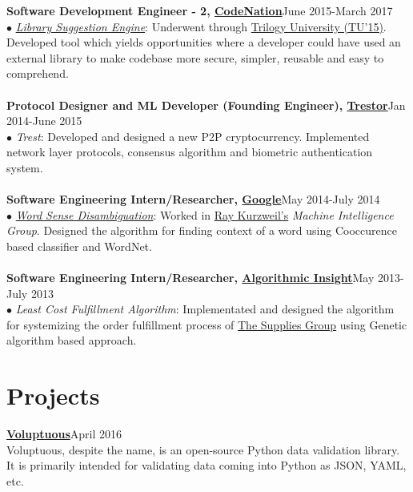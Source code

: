 \documentclass[margin,line]{resume}
\begin{document}
\begin{resume}
{\bf Software Development Engineer - 2, \href{http://codenation.co.in/}{CodeNation}}\hfill June 2015-March 2017\\
	$\bullet$ \href{https://patents.google.com/patent/US10048945B1/}{\emph{Library Suggestion Engine}}: Underwent through \href{https://hbr.org/2001/04/no-ordinary-boot-camp}{Trilogy University (TU'15)}. Developed tool which yields opportunities where a developer could have used an external library to make codebase more secure, simpler, reusable and easy to comprehend.\\\\
     {\bf Protocol Designer and ML Developer (Founding Engineer), \href{https://www.linkedin.com/company/trestor-foundation/}{Trestor}}\hfill Jan 2014-June 2015\\
	$\bullet$ \emph{Trest}: Developed and designed a new P2P cryptocurrency. Implemented network layer protocols, consensus algorithm and biometric authentication system.\\\\
    {\bf Software Engineering Intern/Researcher, \href{https://www.google.com/}{Google}}\hfill May 2014-July 2014\\
      $\bullet$ \href{https://en.wikipedia.org/wiki/Word-sense_disambiguation}{\emph{Word Sense Disambiguation}}: Worked in \href{http://en.wikipedia.org/wiki/Ray_Kurzweil}{Ray Kurzweil's} \emph{Machine Intelligence Group}. Designed the algorithm for finding context of a word using Cooccurence based classifier and WordNet.\\\\
         {\bf Software Engineering Intern/Researcher, \href{http://tatrasdata.com/}{Algorithmic Insight}}\hfill May 2013-July 2013\\
      $\bullet$ \emph{Least Cost Fulfillment Algorithm}: Implementated and designed the algorithm for systemizing the order fulfillment process of \href{http://www.suppliesguys.com/}{The Supplies Group} using Genetic algorithm based approach.

\section{\mysidestyle \bf Projects}

 {\bf\href{https://github.com/alecthomas/voluptuous}{Voluptuous}}\hfill April 2016 \\
Voluptuous, despite the name, is an open-source Python data validation library. It is primarily intended for validating data coming into Python as JSON, YAML, etc.


\end{resume}
\end{document}
